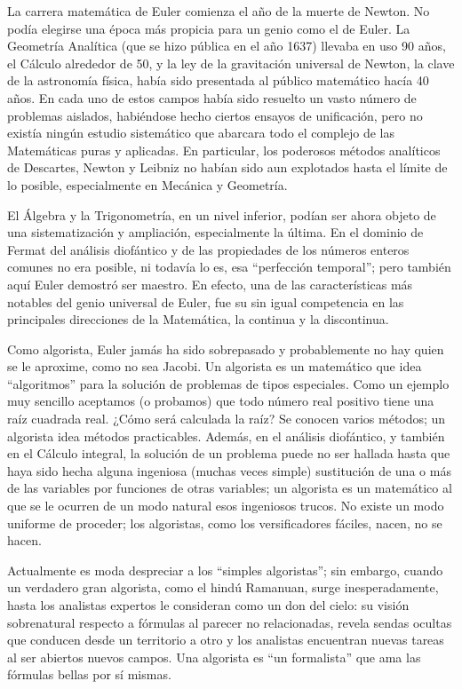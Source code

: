 \documentclass[a4paper, 12pt]{article}
\begin{document}
La carrera matemática de Euler comienza el año de la muerte de Newton. No podía elegirse una época más propicia para un genio como el de Euler. La Geometría Analítica (que se hizo pública en el año 1637) llevaba en uso 90 años, el Cálculo alrededor de 50, y la ley de la gravitación universal de Newton, la clave de la astronomía física, había sido presentada al público matemático hacía 40 años. En cada uno de estos campos había sido resuelto un vasto número de problemas aislados, habiéndose hecho ciertos ensayos de unificación, pero no existía ningún estudio sistemático que abarcara todo el complejo de las Matemáticas puras y aplicadas. En particular, los poderosos métodos analíticos de Descartes, Newton y Leibniz no habían sido aun explotados hasta el límite de lo posible, especialmente en Mecánica y Geometría.

El Álgebra y la Trigonometría, en un nivel inferior, podían ser ahora objeto de una sistematización y ampliación, especialmente la última. En el dominio de Fermat del análisis diofántico y de las propiedades de los números enteros comunes no era posible, ni todavía lo es, esa ``perfección temporal''; pero también aquí Euler demostró ser maestro. En efecto, una de las características más notables del genio universal de Euler, fue su sin igual competencia en las principales direcciones de la Matemática, la continua y la discontinua.

Como algorista, Euler jamás ha sido sobrepasado y probablemente no hay quien se le aproxime, como no sea Jacobi. Un algorista es un matemático que idea ``algoritmos'' para la solución de problemas de tipos especiales. Como un ejemplo muy sencillo aceptamos (o probamos) que todo número real positivo tiene una raíz cuadrada real. ¿Cómo será calculada la raíz? Se conocen varios métodos; un algorista idea métodos practicables. Además, en el análisis diofántico, y también en el Cálculo integral, la solución de un problema puede no ser hallada hasta que haya sido hecha alguna ingeniosa (muchas veces simple) sustitución de una o más de las variables por funciones de otras variables; un algorista es un matemático al que se le ocurren de un modo natural esos ingeniosos trucos. No existe un modo uniforme de proceder; los algoristas, como los versificadores fáciles, nacen, no se hacen.

Actualmente es moda despreciar a los ``simples algoristas''; sin embargo, cuando un verdadero gran algorista, como el hindú Ramanuan, surge inesperadamente, hasta los analistas expertos le consideran como un don del cielo: su visión sobrenatural respecto a fórmulas al parecer no relacionadas, revela sendas ocultas que conducen desde un territorio a otro y los analistas encuentran nuevas tareas al ser abiertos nuevos campos. Una algorista es ``un formalista'' que ama las fórmulas bellas por sí mismas.
\end{document}
